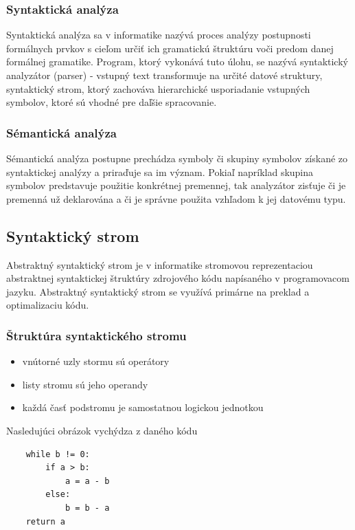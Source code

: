 \subsubsection{Syntaktická analýza}
Syntaktická analýza sa v informatike nazývá proces analýzy postupnosti 
formálnych prvkov s cieľom určiť ich gramatickú štruktúru voči predom danej formálnej gramatike.
Program, ktorý vykonává tuto úlohu, se nazývá syntaktický analyzátor (parser) - 
vstupný text transformuje na určité datové struktury, syntaktický strom, 
ktorý zachováva hierarchické usporiadanie vstupných symbolov, ktoré sú vhodné pre daľšie spracovanie.

\subsubsection{Sémantická analýza}
Sémantická analýza postupne prechádza symboly či skupiny symbolov získané 
zo syntaktickej analýzy a priraďuje sa im význam. Pokiaľ napríklad skupina symbolov
predstavuje použitie konkrétnej premennej, tak analyzátor zisťuje či je premenná už 
deklarována a či je správne použita vzhľadom k jej datovému typu.

\subsection{Syntaktický strom}
Abstraktný syntaktický strom je v informatike stromovou reprezentaciou 
abstraktnej syntaktickej štruktúry zdrojového kódu 
napísaného v programovacom jazyku. 
Abstraktný syntaktický strom se využívá primárne na preklad a optimalizaciu kódu.

\subsubsection{Štruktúra syntaktického stromu}

\begin{itemize}
	\item vnútorné uzly stormu sú operátory

	\item listy stromu sú jeho operandy

	\item každá časť podstromu je samostatnou logickou jednotkou
\end{itemize}

Nasledujúci obrázok vychýdza z daného kódu
\begin{lstlisting}
	while b != 0:
		if a > b:
			a = a - b
		else:
			b = b - a
	return a
\end{lstlisting}


